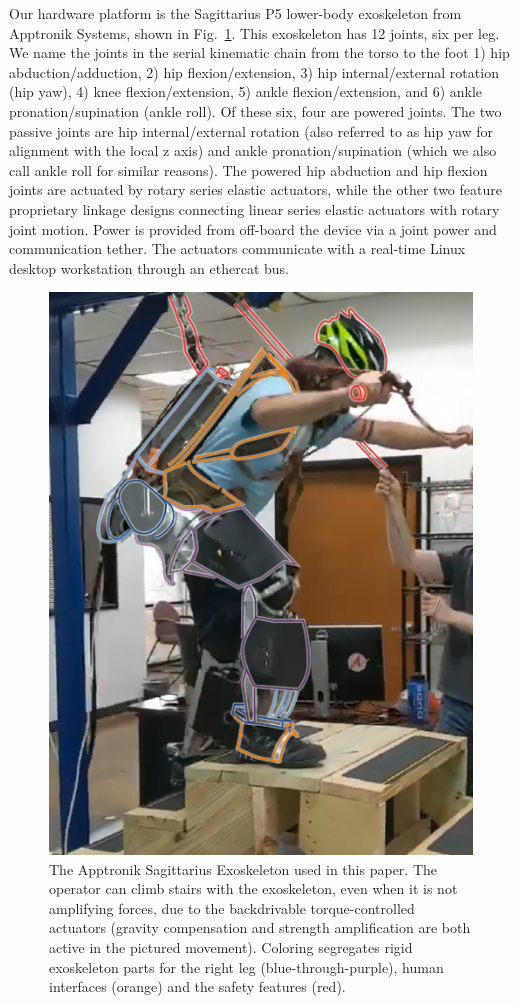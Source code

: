 \documentclass[utf8]{frontiersSCNS}
\newcommand{\add}[1]{\textcolor[HTML]{8710b3}{#1}}
\begin{document}
Our hardware platform is the Sagittarius P5 lower-body exoskeleton from Apptronik Systems, shown in Fig.~\ref{fig:parts}. This exoskeleton has 12 joints, six per leg. We name the joints in the serial kinematic chain from the torso to the foot 1) hip abduction/adduction, 2) hip flexion/extension, 3) hip internal/external rotation (hip yaw), 4) knee flexion/extension, 5) ankle flexion/extension, and 6) ankle pronation/supination (ankle roll). Of these six, four are powered joints. The two passive joints are hip internal/external rotation (also referred to as hip yaw for alignment with the local z axis) and ankle pronation/\add{supination} (which we also call ankle roll for similar reasons). The powered hip abduction and hip flexion joints are actuated by rotary series elastic actuators, while the other two feature proprietary linkage designs connecting linear series elastic actuators with rotary joint motion. Power is provided from off-board the device via a joint power and communication tether. The actuators communicate with a real-time Linux desktop workstation through an ethercat bus.


\begin{figure}[]\centering
	\includegraphics[width=.5\columnwidth]{exo_parts.pdf}%
	\caption{The Apptronik Sagittarius Exoskeleton used in this paper. The operator can climb stairs with the exoskeleton, even when it is not amplifying forces, due to the backdrivable torque-controlled actuators (gravity compensation and strength amplification are both active in the pictured movement). Coloring segregates rigid exoskeleton parts for the right leg (blue-through-purple), human interfaces (orange) and the safety features (red).}\label{fig:parts}
\end{figure}
\end{document}
